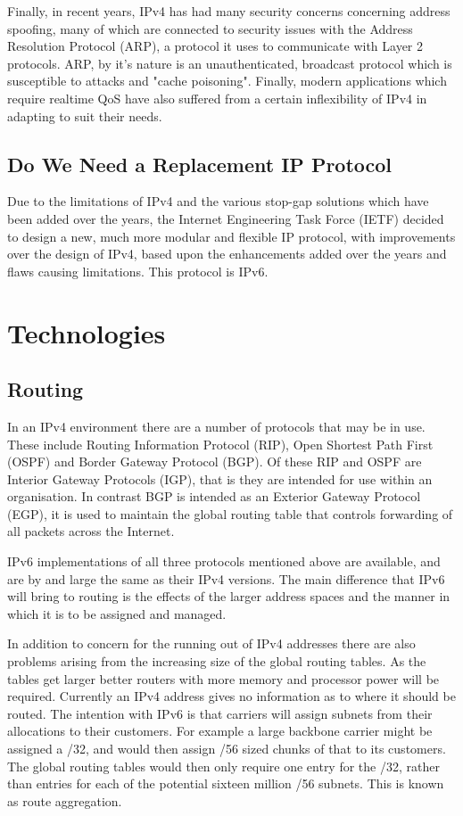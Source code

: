 \documentclass[a4paper,12pt]{article}
\begin{document}
Finally, in recent years, IPv4 has had many security concerns concerning
address spoofing, many of which are connected to security issues with
the Address Resolution Protocol (ARP), a protocol it uses to communicate
with Layer 2 protocols. ARP, by it's nature is an unauthenticated, 
broadcast protocol which is susceptible to attacks and "cache poisoning".
Finally, modern applications which require realtime QoS have also 
suffered from a certain inflexibility of IPv4 in adapting to suit their 
needs.

\subsection{Do We Need a Replacement IP Protocol}

Due to the limitations of IPv4 and the various stop-gap solutions which
have been added over the years, the Internet Engineering Task Force
(IETF) decided to design a new, much more modular and flexible IP
protocol, with improvements over the design of IPv4, based upon the
enhancements added over the years and flaws causing limitations. This
protocol is IPv6.

\section{Technologies}

\subsection{Routing}

In an IPv4 environment there are a number of protocols that may be in use. These
include Routing Information Protocol (RIP), Open Shortest Path First (OSPF) and
Border Gateway Protocol (BGP). Of these RIP and OSPF are Interior Gateway
Protocols (IGP), that is they are intended for use within an organisation. In
contrast BGP is intended as an Exterior Gateway Protocol (EGP), it is used to
maintain the global routing table that controls forwarding of all packets
across the Internet.

IPv6 implementations of all three protocols mentioned above are available, and
are by and large the same as their IPv4 versions. The main difference that IPv6
will bring to routing is the effects of the larger address spaces and the
manner in which it is to be assigned and managed. 

In addition to concern for the running out of IPv4 addresses there are also
problems arising from the increasing size of the global routing tables. As the
tables get larger better routers with more memory and processor power will be
required. Currently an IPv4 address gives no information as to where it should
be routed. The intention with IPv6 is that carriers will assign subnets from
their allocations to their customers. For example a large backbone carrier
might be assigned a /32, and would then assign /56 sized chunks of that to its
customers. The global routing tables would then only require one entry for the
/32, rather than entries for each of the potential sixteen million /56 subnets.
This is known as route aggregation.
\end{document}
